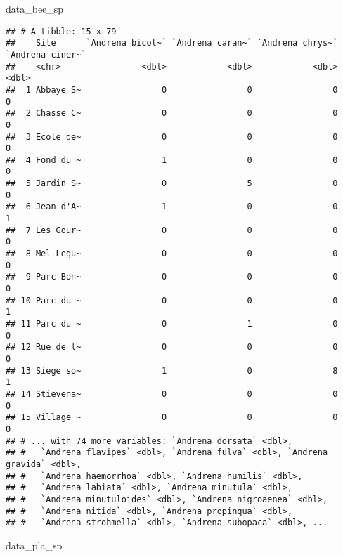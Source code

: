 \documentclass[
]{article}
\newenvironment{Shaded}{\begin{snugshade}}{\end{snugshade}}
\newcommand{\NormalTok}[1]{#1}
\begin{document}
\begin{Shaded}
\begin{Highlighting}[]
\NormalTok{data\_bee\_sp}
\end{Highlighting}
\end{Shaded}

\begin{verbatim}
## # A tibble: 15 x 79
##    Site      `Andrena bicol~` `Andrena caran~` `Andrena chrys~` `Andrena ciner~`
##    <chr>                <dbl>            <dbl>            <dbl>            <dbl>
##  1 Abbaye S~                0                0                0                0
##  2 Chasse C~                0                0                0                0
##  3 Ecole de~                0                0                0                0
##  4 Fond du ~                1                0                0                0
##  5 Jardin S~                0                5                0                0
##  6 Jean d'A~                1                0                0                1
##  7 Les Gour~                0                0                0                0
##  8 Mel Legu~                0                0                0                0
##  9 Parc Bon~                0                0                0                0
## 10 Parc du ~                0                0                0                1
## 11 Parc du ~                0                1                0                0
## 12 Rue de l~                0                0                0                0
## 13 Siege so~                1                0                8                1
## 14 Stievena~                0                0                0                0
## 15 Village ~                0                0                0                0
## # ... with 74 more variables: `Andrena dorsata` <dbl>,
## #   `Andrena flavipes` <dbl>, `Andrena fulva` <dbl>, `Andrena gravida` <dbl>,
## #   `Andrena haemorrhoa` <dbl>, `Andrena humilis` <dbl>,
## #   `Andrena labiata` <dbl>, `Andrena minutula` <dbl>,
## #   `Andrena minutuloides` <dbl>, `Andrena nigroaenea` <dbl>,
## #   `Andrena nitida` <dbl>, `Andrena propinqua` <dbl>,
## #   `Andrena strohmella` <dbl>, `Andrena subopaca` <dbl>, ...
\end{verbatim}

\begin{Shaded}
\begin{Highlighting}[]
\NormalTok{data\_pla\_sp}
\end{Highlighting}
\end{Shaded}
\end{document}
